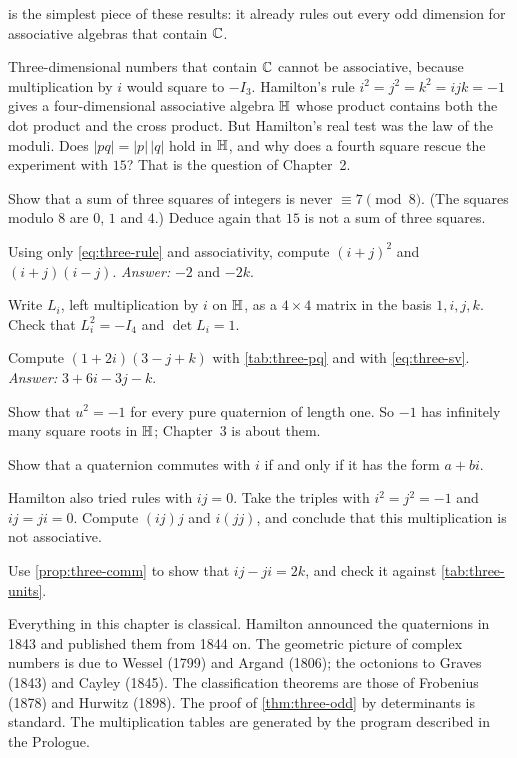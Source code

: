 is the simplest piece of these results: it already rules out every odd dimension for associative algebras that contain $\mathbb{C}$.

\begin{learned}
Three-dimensional numbers that contain $\mathbb{C}$ cannot be associative, because multiplication by $i$ would square to $-I_3$. Hamilton's rule $i^2=j^2=k^2=ijk=-1$ gives a four-dimensional associative algebra $\mathbb{H}$ whose product contains both the dot product and the cross product. But Hamilton's real test was the law of the moduli. Does $|pq|=|p|\,|q|$ hold in $\mathbb{H}$, and why does a fourth square rescue the experiment with $15$? That is the question of Chapter~2.
\end{learned}

\begin{exercises}
\item Show that a sum of three squares of integers is never $\equiv7\pmod 8$. (The squares modulo $8$ are $0$, $1$ and $4$.) Deduce again that $15$ is not a sum of three squares.
\item Using only \eqref{eq:three-rule} and associativity, compute $(i+j)^2$ and $(i+j)(i-j)$. \emph{Answer:} $-2$ and $-2k$.
\item Write $L_i$, left multiplication by $i$ on $\mathbb{H}$, as a $4\times4$ matrix in the basis $1,i,j,k$. Check that $L_i^2=-I_4$ and $\det L_i=1$.
\item Compute $(1+2i)(3-j+k)$ with \cref{tab:three-pq} and with \eqref{eq:three-sv}. \emph{Answer:} $3+6i-3j-k$.
\item Show that $u^2=-1$ for every pure quaternion of length one. So $-1$ has infinitely many square roots in $\mathbb{H}$; Chapter~3 is about them.
\item Show that a quaternion commutes with $i$ if and only if it has the form $a+bi$.
\item Hamilton also tried rules with $ij=0$. Take the triples with $i^2=j^2=-1$ and $ij=ji=0$. Compute $(ij)j$ and $i(jj)$, and conclude that this multiplication is not associative.
\item Use \cref{prop:three-comm} to show that $ij-ji=2k$, and check it against \cref{tab:three-units}.
\end{exercises}

\begin{sources}
Everything in this chapter is classical. Hamilton announced the quaternions in 1843 and published them from 1844 on. The geometric picture of complex numbers is due to Wessel (1799) and Argand (1806); the octonions to Graves (1843) and Cayley (1845). The classification theorems are those of Frobenius (1878) and Hurwitz (1898). The proof of \cref{thm:three-odd} by determinants is standard. The multiplication tables are generated by the program described in the Prologue.
\end{sources}
